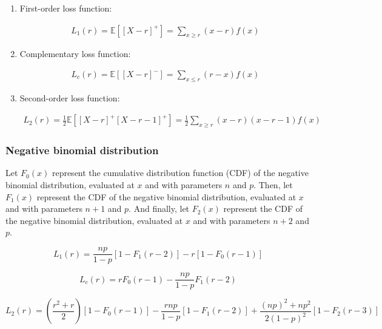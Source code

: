 \documentclass{article}
\begin{document}
\begin{enumerate}
    \item First-order loss function:

          \begin{align*}
              L_1(r) = \mathbb{E}[[X-r]^+] = \sum_{x \ge r} (x-r)f(x)
          \end{align*}

    \item Complementary loss function:

          \begin{align*}
              L_c(r) = \mathbb{E}[[X-r]^-] = \sum_{x \le r} (r-x)f(x)
          \end{align*}

    \item Second-order loss function:

          \begin{align*}
              L_2(r) = \frac{1}{2}\mathbb{E}[[X-r]^+[X-r-1]^+] = \frac{1}{2}\sum_{x \ge r} (x-r)(x-r-1)f(x)
          \end{align*}

\end{enumerate}

\subsubsection{Negative binomial distribution}

Let $F_0(x)$ represent the cumulative distribution function (CDF) of the negative binomial distribution, evaluated at $x$ and with parameters $n$ and $p$.
Then, let $F_1(x)$ represent the CDF of the negative binomial distribution, evaluated at $x$ and with parameters $n+1$ and $p$.
And finally, let $F_2 (x)$ represent the CDF of the negative binomial distribution, evaluated at $x$ and with parameters $n+2$ and $p$.

\begin{equation}
    L_1(r) = \frac{np}{1-p}[1-F_1(r-2)]-r[1-F_0(r-1)]
\end{equation}

\begin{equation}
    L_c(r) = rF_0(r-1)-\frac{np}{1-p}F_1(r-2)
\end{equation}

\begin{equation}
    L_2(r) = \left(\frac{r^2+r}{2}\right)[1-F_0(r-1)]-\frac{rnp}{1-p}[1-F_1(r-2)]+\frac{(np)^2+np^2}{2(1-p)^2}[1-F_2(r-3)]
\end{equation}
\end{document}
